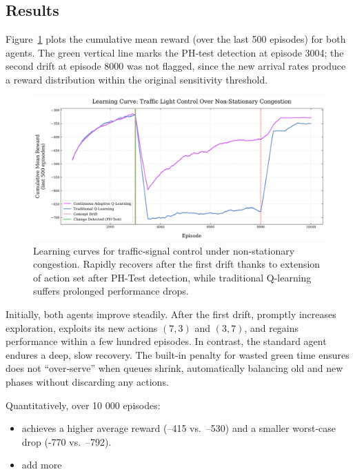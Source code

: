 \subsection{Results}
Figure~\ref{fig:traffic-learning-curve} plots the cumulative mean reward (over the last 500 episodes) for both agents. The green vertical line marks the PH‐test detection at episode 3004; the second drift at episode 8000 was not flagged, since the new arrival rates produce a reward distribution within the original sensitivity threshold.

\begin{figure}
    \centering
    \includegraphics[width=\textwidth]{figures/traffic_learning_curve.png}
    \caption{Learning curves for traffic‐signal control under non‐stationary congestion. Rapidly recovers after the first drift thanks to extension of action set after PH-Test detection, while traditional Q-learning suffers prolonged performance drops.}
    \label{fig:traffic-learning-curve}
\end{figure}

Initially, both agents improve steadily. After the first drift, \adaptiverl promptly increases exploration, exploits its new actions $(7,3)$ and $(3,7)$, and regains performance within a few hundred episodes. In contrast, the standard agent endures a deep, slow recovery. The built-in penalty for wasted green time ensures \adaptiverl does not “over‐serve” when queues shrink, automatically balancing old and new phases without discarding any actions.

Quantitatively, over 10 000 episodes:
\begin{itemize}
  \item \adaptiverl achieves a higher average reward (–415 vs.\ –530) and a smaller worst‐case drop (-770 vs.\ –792).
  \item add more
\end{itemize}

